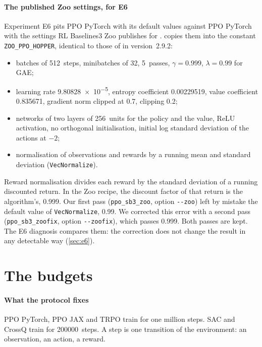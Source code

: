 \paragraph{The published Zoo settings, for E6}
Experiment E6 pits PPO PyTorch with its default values against PPO PyTorch with the settings RL Baselines3
Zoo publishes for .  copies them into the constant
\texttt{ZOO\_PPO\_HOPPER}, identical to those of  in version~2.9.2:
\begin{itemize}
  \item batches of 512~steps, minibatches of 32, 5~passes, $\gamma = 0.999$, $\lambda = 0.99$ for GAE;
  \item learning rate \num{9.80828e-5}, entropy coefficient \num{0.00229519}, value coefficient
    \num{0.835671}, gradient norm clipped at 0.7, clipping 0.2;
  \item networks of two layers of 256~units for the policy and the value, ReLU activation, no orthogonal
    initialisation, initial log standard deviation of the actions at $-2$;
  \item normalisation of observations and rewards by a running mean and standard deviation
    (\texttt{VecNormalize}).
\end{itemize}
Reward normalisation divides each reward by the standard deviation of a running discounted return. In the Zoo
recipe, the discount factor of that return is the algorithm's, 0.999. Our first pass
(\texttt{ppo\_sb3\_zoo}, option \texttt{-{}-zoo}) left by mistake the default value of \texttt{VecNormalize},
0.99. We corrected this error with a second pass (\texttt{ppo\_sb3\_zoofix}, option \texttt{-{}-zoofix}),
which passes 0.999. Both passes are kept. The E6 diagnosis compares them: the correction does not change the
result in any detectable way (\cref{sec:e6}).

\section{The budgets}\label{sec:budgets}

\paragraph{What the protocol fixes}
PPO PyTorch, PPO JAX and TRPO train for one million steps. SAC and CrossQ train for \num{200000}~steps. A step
is one transition of the environment: an observation, an action, a reward.

